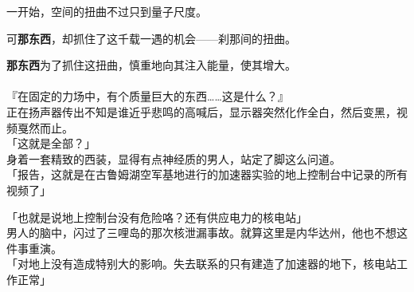 一开始，空间的扭曲不过只到量子尺度。

可\textbf{那东西}，却抓住了这千载一遇的机会——刹那间的扭曲。

\textbf{那东西}为了抓住这扭曲，慎重地向其注入能量，使其增大。\\

\sqsplit\\

『在固定的力场中，有个质量巨大的东西……这是什么？』\\

正在扬声器传出不知是谁近乎悲鸣的高喊后，显示器突然化作全白，然后变黑，视频戛然而止。\\

「这就是全部？」\\

身着一套精致的西装，显得有点神经质的男人，站定了脚这么问道。\\

「报告，这就是在古鲁姆湖空军基地进行的加速器实验的地上控制台中记录的所有视频了」

「也就是说地上控制台没有危险咯？还有供应电力的核电站」\\

男人的脑中，闪过了三哩岛的那次核泄漏事故。就算这里是内华达州，他也不想这件事重演。\\

「对地上没有造成特别大的影响。失去联系的只有建造了加速器的地下，核电站工作正常」

